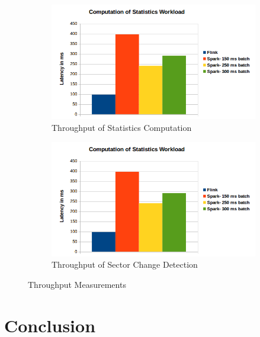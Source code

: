 \documentclass[]{article}
\begin{document}
\begin{figure}[h]
\begin{subfigure}{.5\textwidth}
  \centering
  \includegraphics[width=\linewidth]{latency1.png}
  \caption{Throughput of Statistics Computation}

\end{subfigure}%
\begin{subfigure}{.5\textwidth}
  \centering
  \includegraphics[width=\linewidth]{latency1.png}
\caption{Throughput of Sector Change Detection }

\end{subfigure}
\caption{Throughput Measurements}
\label{fig:fig}
\end{figure}

\newpage

\section{Conclusion}
\end{document}
